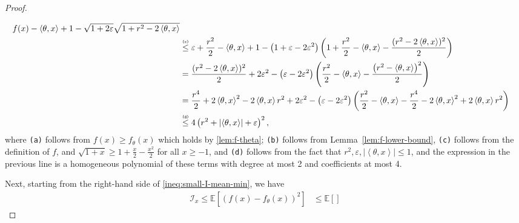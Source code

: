 \documentclass[letter, 12pt]{report}
\newcommand{\todoa}[2][]{\todo[size=\scriptsize,color=green!20!white,#1]{Alr: #2}}
\newcommand{\explan}[1]{\stackrel{\text{\tiny \texttt{#1}}}}
\newcommand{\ip}[1]{\left \langle #1 \right \rangle}
\newcommand{\paren}[1]{\left( #1 \right)}
\newcommand{\abs}[1]{\left| #1 \right|}
\newcommand{\brak}[1]{\left[ #1 \right]}
\newcommand{\E}{\mathbb E}
\newcommand{\cI}{\mathcal I}
\newcommand{\1}{\mathbf{1}}
\renewcommand{\epsilon}{\varepsilon}
\theoremstyle{plain}
\theoremstyle{definition}
\theoremstyle{remark}
\begin{document}
\begin{proof}
\begin{enumcases}
\begin{align*}
            f(x)
            - \ip{\theta, x} + 1 - \sqrt{1 + 2\epsilon}\sqrt{1 + r^2 - 2\ip{\theta, x}}
            \\
             &
            \explan{(c)}
            \leq
            \epsilon
            +
            \frac{r^2}{2}
            - \ip{\theta, x} + 1 - \paren{1 + \epsilon - 2\epsilon^2}
            \paren{
                1 +
                \frac{r^2}{2} - \ip{\theta, x}
                -
                \frac{
                    (r^2 - 2\ip{\theta, x})^2
                }{2}
            }
            \\
             &
            =
            \frac{(r^2 - 2\ip{\theta, x})^2}{2}
            +
            2\epsilon^2
            -
            \paren{\epsilon - 2\epsilon^2}
            \paren{\frac{r^2}{2} - \ip{\theta, x} - \frac{\paren{r^2 - \ip{\theta,x}}^2}{2}}
            \\
             &
            =
            \frac{r^4}{2} + 2\ip{\theta, x}^2 - 2\ip{\theta, x}r^2
            +
            2\epsilon^2
            -
            \paren{\epsilon - 2\epsilon^2}
            \paren{\frac{r^2}{2} - \ip{\theta, x} -
                \frac{r^4}{2} - 2\ip{\theta, x}^2 + 2\ip{\theta, x}r^2
            }
            \\
             &
            \explan{(d)}
            \leq
            4
            \paren{r^2 + \abs{\ip{\theta, x}} + \epsilon}^2
            ,
        \end{align*}
        where \texttt{(a)} follows from $f(x) \geq f_\theta(x)$ which holds by \cref{lem:f-theta};
        \texttt{(b)} follows from Lemma~\ref{lem:f-lower-bound},
        \texttt{(c)} follows from the definition of $f$, and $\sqrt{1 + x} \geq 1 + \frac{x}{2} - \frac{x^2}{2}$ for all $x\geq-1$,
        and \texttt{(d)} follows from the fact that $r^2, \epsilon, \abs{\ip{\theta, x}} \leq 1$,
        and the expression in the previous line is a homogeneous polynomial of
        these terms with degree at most 2 and coefficients at most 4.
    \end{enumcases}
    Next,
    starting from the right-hand side of \cref{ineq:small-I-mean-min},
    we have
    \begin{align*}
        \cI_x \leq
        \E\brak{
            \paren{
                f(x)
                -
                f_\theta(x)
            }^2
        }
         & \leq
        \E\brak{
}
\end{align*}
\end{proof}
\end{document}
